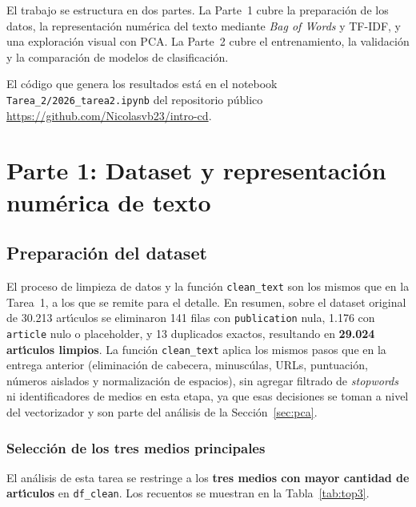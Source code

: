 \documentclass[11pt,a4paper]{article}
\begin{document}
El trabajo se estructura en dos partes. La Parte~1 cubre la preparaci\'{o}n de los datos, la representaci\'{o}n num\'{e}rica del texto mediante \textit{Bag of Words} y TF-IDF, y una exploraci\'{o}n visual con PCA. La Parte~2 cubre el entrenamiento, la validaci\'{o}n y la comparaci\'{o}n de modelos de clasificaci\'{o}n.

El c\'{o}digo que genera los resultados est\'{a} en el notebook \texttt{Tarea\_2/2026\_tarea2.ipynb} del repositorio p\'{u}blico \url{https://github.com/Nicolasvb23/intro-cd}.

\section{Parte 1: Dataset y representaci\'{o}n num\'{e}rica de texto}

\subsection{Preparaci\'{o}n del dataset}

El proceso de limpieza de datos y la funci\'{o}n \texttt{clean\_text} son los mismos que en la Tarea~1, a los que se remite para el detalle. En resumen, sobre el dataset original de 30.213 art\'{\i}culos se eliminaron 141 filas con \texttt{publication} nula, 1.176 con \texttt{article} nulo o placeholder, y 13 duplicados exactos, resultando en \textbf{29.024 art\'{\i}culos limpios}. La funci\'{o}n \texttt{clean\_text} aplica los mismos pasos que en la entrega anterior (eliminaci\'{o}n de cabecera, minusc\'{u}las, URLs, puntuaci\'{o}n, n\'{u}meros aislados y normalizaci\'{o}n de espacios), sin agregar filtrado de \textit{stopwords} ni identificadores de medios en esta etapa, ya que esas decisiones se toman a nivel del vectorizador y son parte del an\'{a}lisis de la Secci\'{o}n~\ref{sec:pca}.

\subsubsection*{Selecci\'{o}n de los tres medios principales}

El an\'{a}lisis de esta tarea se restringe a los \textbf{tres medios con mayor cantidad de art\'{\i}culos} en \texttt{df\_clean}. Los recuentos se muestran en la Tabla~\ref{tab:top3}.
\end{document}
